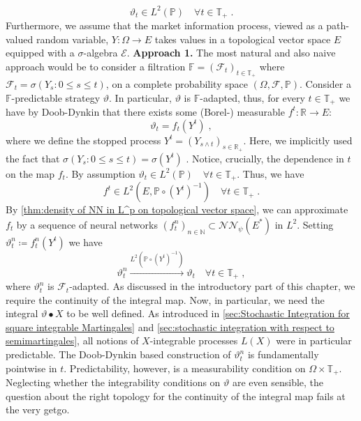 \documentclass[11pt]{report}
\theoremstyle{plain} %
\theoremstyle{definition} %
\theoremstyle{remark} %
\begin{document}
\begin{equation}
      \vartheta_t\in L^2(\mathbb{P})\quad\forall t\in\mathbb{T}_+\;.
\end{equation}
Furthermore, we assume that the market information process, viewed as a path-valued random variable, \(Y:\Omega\to E\) takes values in a topological vector space \(E\) equipped with a \(\sigma\)-algebra \(\mathcal{E}\). 
\bigbreak
\textbf{Approach 1.}
The most natural and also naive approach would be to consider a filtration \(\mathbb{F}=(\mathcal{F}_t)_{t\in\mathbb{T}_+}\) where \(\mathcal{F}_t=\sigma(Y_s:0\leq s\leq t )\), on a complete probability space \((\Omega,\mathcal{F},\mathbb{P})\).  Consider a \(\mathbb{F}\)-predictable strategy \(\vartheta\). In particular, \(\vartheta\) is \(\mathbb{F}\)-adapted, thus, for every \(t\in\mathbb{T}_+\) we have by Doob-Dynkin that there exists some (Borel-) measurable \(f^t:\mathbb{R}\to E\):
\begin{equation}
    \vartheta_t=f_t(Y^t)\;,
\end{equation}
where we define the stopped process \(Y^t=(Y_{s\wedge t})_{s\in\mathbb{R}_+}\). Here, we implicitly used the fact that \(\sigma(Y_s:0\leq s\leq t)=\sigma(Y^t)\) \parencite[Problem~4.2.]{KaratzasShreve1991Brownian}. Notice, crucially, the dependence in \(t\) on the map \(f_t\). By assumption 
\(
    \vartheta_t\in L^2(\mathbb{P})\quad\forall t\in\mathbb{T}_+
\).
Thus, we have
\begin{equation}
    f^t\in L^2(E,\mathbb{P}\circ(Y^t)^{-1})\quad\forall t\in\mathbb{T}_+\;.
\end{equation}
By \cref{thm:density of NN in L^p on topological vector space}, we can approximate \(f_t\) by a sequence of neural networks \((f_t^n)_{n\in\mathbb{N}}\subset\mathcal{NN}_\psi(E^*)\) in \(L^2\). Setting \(\vartheta^n_t\coloneqq f^n_t(Y^t)\) we have
\begin{equation}
    \vartheta_t^n\overset{L^2(\mathbb{P}\circ(Y^t)^{-1})}{\to}\vartheta_t\quad\forall t\in\mathbb{T}_+\;,
\end{equation}
where \(\vartheta_t^n\) is \(\mathcal{F}_t\)-adapted.
As discussed in the introductory part of this chapter, we require the continuity of the integral map. Now, in particular, we need the integral \(\vartheta\bullet X\) to be well defined. As introduced in \cref{sec:Stochastic Integration for square integrable Martingales} and \cref{sec:stochastic integration with respect to semimartingales}, all notions of \(X\)-integrable processes \(L(X)\) were in particular predictable. The Doob-Dynkin based construction of \(\vartheta_t^n\) is fundamentally pointwise in \(t\). Predictability, however, is a measurability condition on \(\Omega\times\mathbb{T}_+\). Neglecting whether the integrability conditions on \(\vartheta\) are even sensible, the question about the right topology for the continuity of the integral map fails at the very getgo. \\\\
\end{document}
